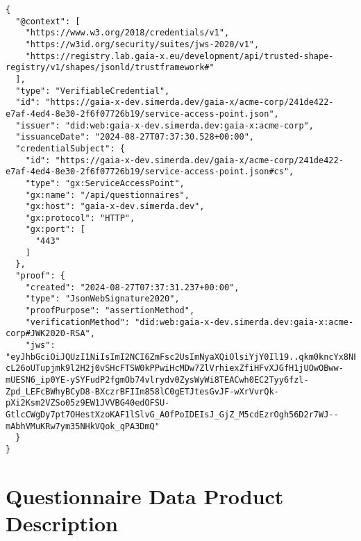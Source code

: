 \begin{verbatim}
{
  "@context": [
    "https://www.w3.org/2018/credentials/v1",
    "https://w3id.org/security/suites/jws-2020/v1",
    "https://registry.lab.gaia-x.eu/development/api/trusted-shape-registry/v1/shapes/jsonld/trustframework#"
  ],
  "type": "VerifiableCredential",
  "id": "https://gaia-x-dev.simerda.dev/gaia-x/acme-corp/241de422-e7af-4ed4-8e30-2f6f07726b19/service-access-point.json",
  "issuer": "did:web:gaia-x-dev.simerda.dev:gaia-x:acme-corp",
  "issuanceDate": "2024-08-27T07:37:30.528+00:00",
  "credentialSubject": {
    "id": "https://gaia-x-dev.simerda.dev/gaia-x/acme-corp/241de422-e7af-4ed4-8e30-2f6f07726b19/service-access-point.json#cs",
    "type": "gx:ServiceAccessPoint",
    "gx:name": "/api/questionnaires",
    "gx:host": "gaia-x-dev.simerda.dev",
    "gx:protocol": "HTTP",
    "gx:port": [
      "443"
    ]
  },
  "proof": {
    "created": "2024-08-27T07:37:31.237+00:00",
    "type": "JsonWebSignature2020",
    "proofPurpose": "assertionMethod",
    "verificationMethod": "did:web:gaia-x-dev.simerda.dev:gaia-x:acme-corp#JWK2020-RSA",
    "jws": "eyJhbGciOiJQUzI1NiIsImI2NCI6ZmFsc2UsImNyaXQiOlsiYjY0Il19..qkm0kncYx8NF0FKwtAbs2oPUTRj-cL26oUTupjmk9l2H2j0vSHcFTSW0kPPwiHcMDw7ZlVrhiexZfiHFvXJGfH1jUOwOBww-mUESN6_ip0YE-ySYFudP2fgmOb74vlrydv0ZysWyWi8TEACwh0EC2Tyy6fzl-Zpd_LEFcBWhyBCyD8-BXczrBFIIm858lC0gETJtesGvJF-wXrVvrQk-pXi2Ksm2VZSo05z9EW1JVVBG40edOFSU-GtlcCWgDy7pt7OHestXzoKAF1lSlvG_A0fPoIDEIsJ_GjZ_M5cdEzrOgh56D2r7WJ--mAbhVMuKRw7ym35NHkVQok_qPA3DmQ"
  }
}
\end{verbatim}


\section{Questionnaire Data Product Description}

